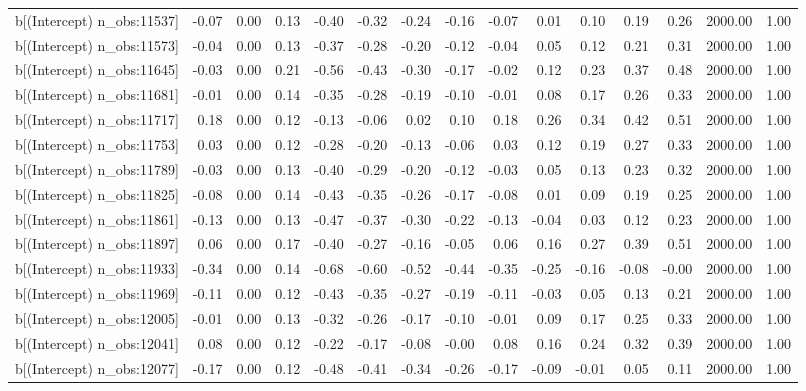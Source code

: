 \begin{table}[ht]
\begin{tabular}{rrrrrrrrrrrrrrr}
  b[(Intercept) n\_obs:11537] & -0.07 & 0.00 & 0.13 & -0.40 & -0.32 & -0.24 & -0.16 & -0.07 & 0.01 & 0.10 & 0.19 & 0.26 & 2000.00 & 1.00 \\ 
  b[(Intercept) n\_obs:11573] & -0.04 & 0.00 & 0.13 & -0.37 & -0.28 & -0.20 & -0.12 & -0.04 & 0.05 & 0.12 & 0.21 & 0.31 & 2000.00 & 1.00 \\ 
  b[(Intercept) n\_obs:11645] & -0.03 & 0.00 & 0.21 & -0.56 & -0.43 & -0.30 & -0.17 & -0.02 & 0.12 & 0.23 & 0.37 & 0.48 & 2000.00 & 1.00 \\ 
  b[(Intercept) n\_obs:11681] & -0.01 & 0.00 & 0.14 & -0.35 & -0.28 & -0.19 & -0.10 & -0.01 & 0.08 & 0.17 & 0.26 & 0.33 & 2000.00 & 1.00 \\ 
  b[(Intercept) n\_obs:11717] & 0.18 & 0.00 & 0.12 & -0.13 & -0.06 & 0.02 & 0.10 & 0.18 & 0.26 & 0.34 & 0.42 & 0.51 & 2000.00 & 1.00 \\ 
  b[(Intercept) n\_obs:11753] & 0.03 & 0.00 & 0.12 & -0.28 & -0.20 & -0.13 & -0.06 & 0.03 & 0.12 & 0.19 & 0.27 & 0.33 & 2000.00 & 1.00 \\ 
  b[(Intercept) n\_obs:11789] & -0.03 & 0.00 & 0.13 & -0.40 & -0.29 & -0.20 & -0.12 & -0.03 & 0.05 & 0.13 & 0.23 & 0.32 & 2000.00 & 1.00 \\ 
  b[(Intercept) n\_obs:11825] & -0.08 & 0.00 & 0.14 & -0.43 & -0.35 & -0.26 & -0.17 & -0.08 & 0.01 & 0.09 & 0.19 & 0.25 & 2000.00 & 1.00 \\ 
  b[(Intercept) n\_obs:11861] & -0.13 & 0.00 & 0.13 & -0.47 & -0.37 & -0.30 & -0.22 & -0.13 & -0.04 & 0.03 & 0.12 & 0.23 & 2000.00 & 1.00 \\ 
  b[(Intercept) n\_obs:11897] & 0.06 & 0.00 & 0.17 & -0.40 & -0.27 & -0.16 & -0.05 & 0.06 & 0.16 & 0.27 & 0.39 & 0.51 & 2000.00 & 1.00 \\ 
  b[(Intercept) n\_obs:11933] & -0.34 & 0.00 & 0.14 & -0.68 & -0.60 & -0.52 & -0.44 & -0.35 & -0.25 & -0.16 & -0.08 & -0.00 & 2000.00 & 1.00 \\ 
  b[(Intercept) n\_obs:11969] & -0.11 & 0.00 & 0.12 & -0.43 & -0.35 & -0.27 & -0.19 & -0.11 & -0.03 & 0.05 & 0.13 & 0.21 & 2000.00 & 1.00 \\ 
  b[(Intercept) n\_obs:12005] & -0.01 & 0.00 & 0.13 & -0.32 & -0.26 & -0.17 & -0.10 & -0.01 & 0.09 & 0.17 & 0.25 & 0.33 & 2000.00 & 1.00 \\ 
  b[(Intercept) n\_obs:12041] & 0.08 & 0.00 & 0.12 & -0.22 & -0.17 & -0.08 & -0.00 & 0.08 & 0.16 & 0.24 & 0.32 & 0.39 & 2000.00 & 1.00 \\ 
  b[(Intercept) n\_obs:12077] & -0.17 & 0.00 & 0.12 & -0.48 & -0.41 & -0.34 & -0.26 & -0.17 & -0.09 & -0.01 & 0.05 & 0.11 & 2000.00 & 1.00 \\ 

\end{tabular}
\end{table}
